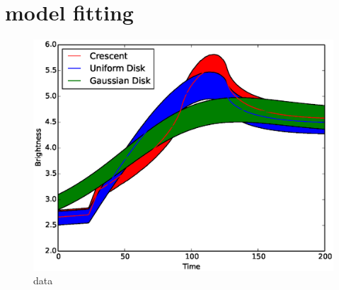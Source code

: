 \section{model fitting}

\begin{figure}
\centering
  \includegraphics[width=0.95\hsize]{plots/data_with_error.eps}
\caption{\label{fig:datafitting} data}
\end{figure}


